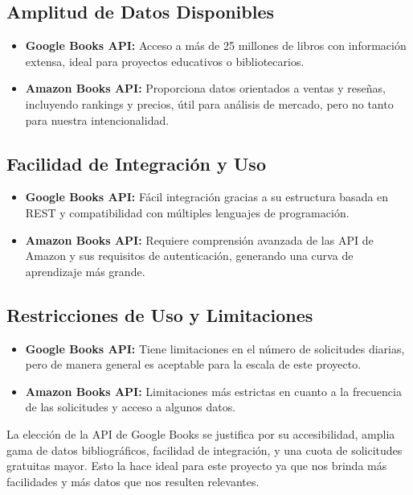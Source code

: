 \subsection{Amplitud de Datos Disponibles}
\begin{itemize}
    \item \textbf{Google Books API:} Acceso a más de 25 millones de libros con información extensa, ideal para proyectos educativos o bibliotecarios.
    \item \textbf{Amazon Books API:} Proporciona datos orientados a ventas y reseñas, incluyendo rankings y precios, útil para análisis de mercado, pero no tanto para nuestra intencionalidad.
\end{itemize}

\subsection{Facilidad de Integración y Uso}
\begin{itemize}
    \item \textbf{Google Books API:} Fácil integración gracias a su estructura basada en REST y compatibilidad con múltiples lenguajes de programación.
    \item \textbf{Amazon Books API:} Requiere comprensión avanzada de las API de Amazon y sus requisitos de autenticación, generando una curva de aprendizaje más grande.
\end{itemize}

\subsection{Restricciones de Uso y Limitaciones}
\begin{itemize}
    \item \textbf{Google Books API:} Tiene limitaciones en el número de solicitudes diarias, pero de manera general es aceptable para la escala de este proyecto.
    \item \textbf{Amazon Books API:} Limitaciones más estrictas en cuanto a la frecuencia de las solicitudes y acceso a algunos datos.
\end{itemize}

La elección de la API de Google Books se justifica por su accesibilidad, amplia gama de datos bibliográficos, facilidad de integración, y una cuota de solicitudes gratuitas mayor. Esto la hace ideal para este proyecto ya que nos brinda más facilidades y más datos que nos resulten relevantes.



